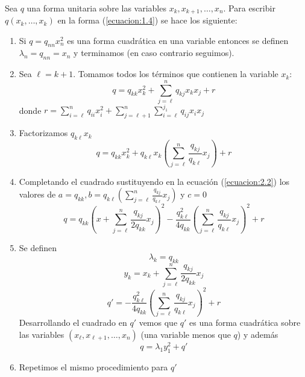 \paragraph{}
Sea $q$ una forma unitaria sobre las variables $x_{k}, x_{k+1}, \ldots, x_{n}$. Para escribir $q\left(x_{k},\ldots,x_{k}\right)$ en la forma (\ref{ecuacion:1.4}) se hace los siguiente:

\begin{enumerate}
\item Si $q = q_{nn}x_{n}^{2}$ es una forma cuadrática en una variable entonces se definen $\lambda_{n} = q_{nn} = x_{n}$ y terminamos (en caso contrario seguimos).
\item Sea $\ell = k + 1$. Tomamos todos los términos que contienen la variable $x_{k}$:
\begin{equation*}
q = q_{kk}x_{k}^{2} + \sum_{j=\ell}^{n}q_{kj}x_{k}x_{j} + r
\end{equation*}
donde $r = \sum_{i=\ell}^{n}q_{ii}x_{i}^{2} + \sum_{j=\ell+1}^{n}\sum_{i=\ell}^{j_1} q_{ij}x_{i}x_{j}$
\item Factorizamos $q_{k\ell}x_{k}$
 \begin{equation*}
q = q_{kk}x_{k}^{2} + q_{k\ell}x_{k}\left(\sum_{j=\ell}^{n}\frac{q_{kj}}{q_{k\ell}}x_{j}\right) + r
\end{equation*}
\item Completando el cuadrado sustituyendo en la ecuación (\ref{ecuacion:2.2}) los valores de $a = q_{kk}, b= q_{k\ell}\left(\sum_{j=\ell}^{n}\frac{q_{kj}}{q_{k\ell}}x_{j}\right)$ y $c=0$
\begin{equation*}
q = q_{kk}\left(x + \sum_{j=\ell}^{n}\frac{q_{kj}}{2q_{kk}}x_{j}\right)^{2} - \frac{q_{k\ell}^{2}}{4q_{kk}}\left(\sum_{j=\ell}^{n}\frac{q_{kj}}{q_{k\ell}}x_{j}\right)^{2} + r
\end{equation*}
\item Se definen
\begin{equation*}
\lambda_{k} = q_{kk}
\end{equation*}
\begin{equation*}
y_{k} = x_{k} + \sum_{j=\ell}^{n}\frac{q_{kj}}{2q_{kk}}x_{j}
\end{equation*}
\begin{equation*}
q' = -\frac{q_{k\ell}^{2}}{4q_{kk}}\left(\sum_{j=\ell}^{n}\frac{q_{kj}}{q_{k\ell}}x_{j}\right)^{2} + r
\end{equation*}
Desarrollando el cuadrado en $q'$ vemos que $q'$ es una forma cuadrática sobre las variables $\left(x_{\ell},x_{\ell+1},\ldots,x_{n}\right)$ (una variable menos que $q$) y además 
\begin{equation*}
q = \lambda_{1}y_{1}^{2} + q'
\end{equation*}
\item Repetimos el mismo procedimiento para $q'$
\end{enumerate}

